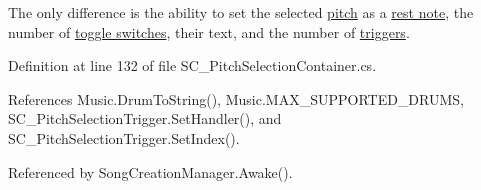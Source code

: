The only difference is the ability to set the selected \hyperlink{group___music_enums_ga508f69b199ea518f935486c990edac1d}{pitch} as a \hyperlink{group___doc_s_c___p_s_c_DocSC_PSCRest}{rest note}, the number of \hyperlink{group___s_c___p_s_c_priv_var_ga25180add92621da773b024083d3a61af}{toggle switches}, their text, and the number of \hyperlink{group___s_c___p_s_c_priv_var_ga8431846d376b98bc6de5a872cce2c596}{triggers}. 

Definition at line 132 of file S\+C\+\_\+\+Pitch\+Selection\+Container.\+cs.



References Music.\+Drum\+To\+String(), Music.\+M\+A\+X\+\_\+\+S\+U\+P\+P\+O\+R\+T\+E\+D\+\_\+\+D\+R\+U\+MS, S\+C\+\_\+\+Pitch\+Selection\+Trigger.\+Set\+Handler(), and S\+C\+\_\+\+Pitch\+Selection\+Trigger.\+Set\+Index().



Referenced by Song\+Creation\+Manager.\+Awake().


